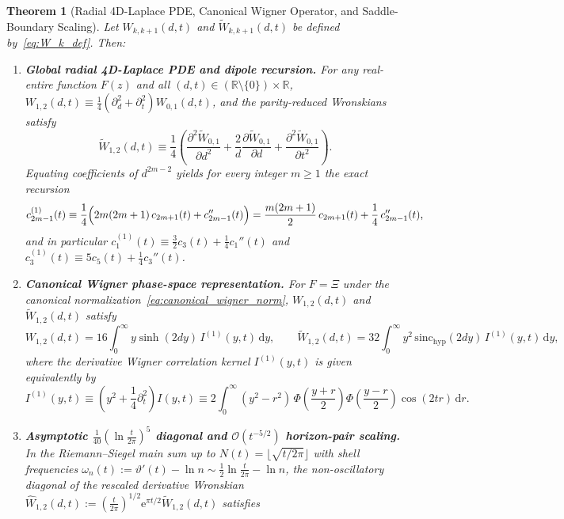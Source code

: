\documentclass[11pt,reqno]{amsart}
\newtheorem{theorem}{Theorem}[section]
\theoremstyle{definition}
\theoremstyle{remark}
\numberwithin{equation}{section}
\newcommand{\R}{\mathbb{R}}
\newcommand{\dd}{\mathrm{d}}
\newcommand{\ee}{\mathrm{e}}
\newcommand{\sinch}{\mathrm{sinc}_{\mathrm{hyp}}}
\begin{document}
\begin{theorem}[Radial 4D-Laplace PDE, Canonical Wigner Operator, and Saddle-Boundary Scaling]\label{thm:laplace_wigner}
Let $W_{k,k+1}(d,t)$ and $\widetilde{W}_{k,k+1}(d,t)$ be defined by~\eqref{eq:W_k_def}. Then:
\begin{enumerate}[label=\textup{(\roman*)},leftmargin=2.2em]
\item \textbf{Global radial 4D-Laplace PDE and dipole recursion.} For any real-entire function $F(z)$ and all $(d,t) \in (\R\setminus\{0\}) \times \R$, $W_{1,2}(d,t) \equiv \frac{1}{4}(\partial_d^2 + \partial_t^2)W_{0,1}(d,t)$, and the parity-reduced Wronskians satisfy
\begin{equation}\label{eq:radial_4d_laplace}
\widetilde{W}_{1,2}(d,t) \equiv \frac{1}{4}\left(\frac{\partial^2\widetilde{W}_{0,1}}{\partial d^2} + \frac{2}{d}\frac{\partial\widetilde{W}_{0,1}}{\partial d} + \frac{\partial^2\widetilde{W}_{0,1}}{\partial t^2}\right).
\end{equation}
Equating coefficients of $d^{2m-2}$ yields for every integer $m \ge 1$ the exact recursion
\begin{equation}\label{eq:universal_dipole_recursion}
c_{2m-1}^{(1)}(t) \equiv \frac{1}{4}\Bigl(2m(2m+1)\,c_{2m+1}(t) + c_{2m-1}''(t)\Bigr) = \frac{m(2m+1)}{2}\,c_{2m+1}(t) + \frac{1}{4}\,c_{2m-1}''(t),
\end{equation}
and in particular $c_1^{(1)}(t) \equiv \frac{3}{2}c_3(t) + \frac{1}{4}c_1''(t)$ and $c_3^{(1)}(t) \equiv 5c_5(t) + \frac{1}{4}c_3''(t)$.
\item \textbf{Canonical Wigner phase-space representation.} For $F = \Xi$ under the canonical normalization~\eqref{eq:canonical_wigner_norm}, $W_{1,2}(d,t)$ and $\widetilde{W}_{1,2}(d,t)$ satisfy
\begin{equation}\label{eq:wigner_W12_integral}
W_{1,2}(d,t) = 16\int_0^\infty y\sinh(2dy)\,I^{(1)}(y,t)\,\dd y, \qquad \widetilde{W}_{1,2}(d,t) = 32\int_0^\infty y^2\,\sinch(2dy)\,I^{(1)}(y,t)\,\dd y,
\end{equation}
where the derivative Wigner correlation kernel $I^{(1)}(y,t)$ is given equivalently by
\begin{equation}\label{eq:I1_wigner_operator}
I^{(1)}(y,t) \equiv \left(y^2 + \frac{1}{4}\partial_t^2\right)I(y,t) \equiv 2\int_0^\infty (y^2 - r^2)\,\Phi\left(\frac{y+r}{2}\right)\Phi\left(\frac{y-r}{2}\right)\cos(2tr)\,\dd r.
\end{equation}
\item \textbf{Asymptotic $\frac{1}{40}(\ln\frac{t}{2\pi})^5$ diagonal and $\mathcal{O}(t^{-5/2})$ horizon-pair scaling.} In the Riemann--Siegel main sum up to $N(t) = \lfloor\sqrt{t/2\pi}\rfloor$ with shell frequencies $\omega_n(t) := \vartheta'(t) - \ln n \sim \frac{1}{2}\ln\frac{t}{2\pi} - \ln n$, the non-oscillatory diagonal of the rescaled derivative Wronskian $\widehat{W}_{1,2}(d,t) := (\frac{t}{2\pi})^{1/2}\ee^{\pi t/2}\widetilde{W}_{1,2}(d,t)$ satisfies

\end{enumerate}
\end{theorem}
\end{document}
